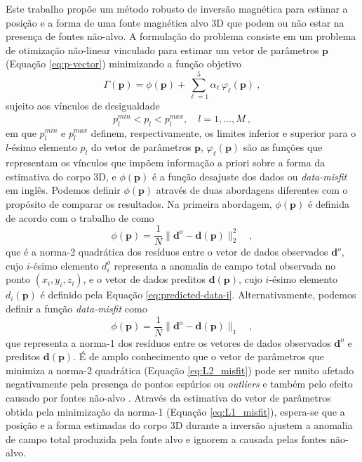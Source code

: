 Este trabalho propõe um método robusto de inversão magnética para estimar a posição e a forma de uma fonte magnética alvo 3D que podem ou não estar na presença de fontes não-alvo.
A formulação do problema consiste em um problema de otimização não-linear vinculado para estimar um vetor de parâmetros $\mathbf{p}$ (Equação \ref{eq:p-vector}) minimizando a função objetivo
\begin{equation}
\Gamma (\mathbf{p}) = \phi (\mathbf{p}) + \sum\limits^{5}_{\ell =1} \alpha_{\ell} \, \varphi_{\ell}(\mathbf{p}) \: ,
\label{eq:gamma}
\end{equation}
sujeito aos vínculos de desigualdade
\begin{equation}
p_{l}^{min} < p_{l} < p_{l}^{max}, \quad l = 1, \dots, M \: ,
\label{eq:inequality-constraints}
\end{equation}
em que $p_{l}^{min}$ e $p_{l}^{max}$ definem, respectivamente, os limites inferior e superior para o $l$-ésimo elemento $p_{l}$ do vetor de parâmetros $\mathbf{p}$,
$\varphi_{\ell}(\mathbf{p})$ são as funções que representam os vínculos que impõem informação a priori sobre a forma da estimativa do corpo 3D, e $\phi (\mathbf{p})$ 
é a função desajuste dos dados ou \textit{data-misfit} em inglês.
Podemos definir $\phi (\mathbf{p})$ através de duas abordagens diferentes com o propósito de comparar os resultados. Na primeira abordagem, $\phi (\mathbf{p})$ é definida de acordo com o trabalho de \citet{vital_etal2019} como
\begin{equation}\label{eq:L2_misfit}
\phi (\mathbf{p}) = \frac{1}{N} 
\| \mathbf{d}^{o} - \mathbf{d}(\mathbf{p}) \|_{2}^{2} \quad ,
\end{equation}
que é a norma-2 quadrática \citep[por exemplo,][p. 331]{aster_etal2019} dos resíduos entre o vetor de dados observados $\mathbf{d}^{o}$, cujo $i$-ésimo elemento $d_{i}^{o}$ representa a anomalia de campo total observada no ponto $(x_{i}, y_{i}, z_{i})$, e o vetor de dados preditos $\mathbf{d}(\mathbf{p})$, cujo $i$-ésimo elemento $d_{i} (\mathbf{p})$ é definido pela Equação \ref{eq:predicted-data-i}.
Alternativamente, podemos definir a função \textit{data-misfit} como
\begin{equation}\label{eq:L1_misfit}
\phi (\mathbf{p}) = \frac{1}{N} 
\| \mathbf{d}^{o} - \mathbf{d}(\mathbf{p}) \|_{1} \quad ,
\end{equation}
que representa a norma-1 \citep[por exemplo,][p. 331]{aster_etal2019}
dos resíduos entre os vetores de dados observados $\mathbf{d}^{o}$ e preditos $\mathbf{d}(\mathbf{p})$.
É de amplo conhecimento que o vetor de parâmetros que minimiza a norma-2 quadrática (Equação \ref{eq:L2_misfit}) pode ser muito afetado negativamente pela presença de pontos espúrios ou \textit{outliers} e também pelo efeito causado por fontes não-alvo \cite[por exemplo,][]{claerbout_muir1973, 
	silva_hohmann1983, scales_gersztenkorn1988, silva_cutrim1989, farquharson_oldenburg1998, 
	uieda_barbosa2012, oliveirajr_etal2015, aster_etal2019}.
Através da estimativa do vetor de parâmetros obtida pela minimização da norma-1 (Equação \ref{eq:L1_misfit}), espera-se que a posição e a forma estimadas do corpo 3D durante a inversão ajustem a anomalia de campo total produzida pela fonte alvo e ignorem a causada pelas fontes não-alvo.

